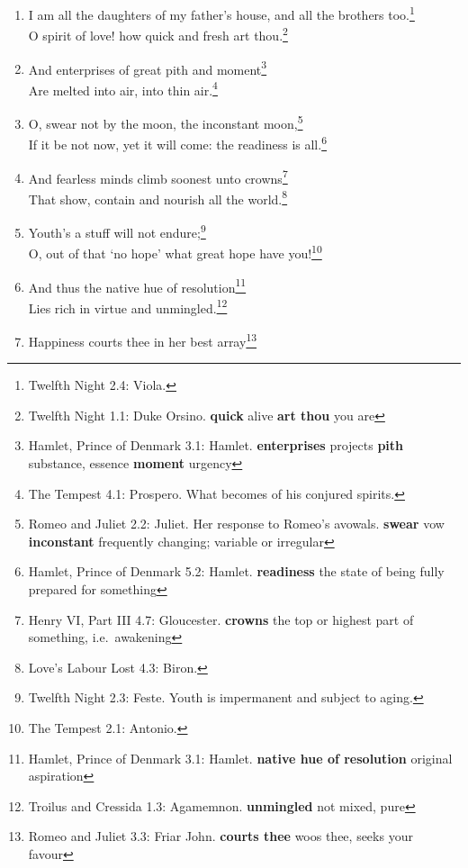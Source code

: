 \documentclass[17pt,twoside]{extarticle}
\begin{document}
\begin{enumerate}
  the very minute bids thee ope thine ear.\footnote{The Tempest 1.2:
    Prospero. He reveals to Miranda her past. \textbf{bids} asks
    \textbf{thee} you \textbf{ope} open \textbf{thine ear} your ear}
\item
  I am all the daughters of my father's house, and all the brothers
  too.\footnote{Twelfth Night 2.4: Viola.}\\O spirit of love! how quick
  and fresh art thou.\footnote{Twelfth Night 1.1: Duke Orsino.
    \textbf{quick} alive \textbf{art thou} you are}
\item
  And enterprises of great pith and moment\footnote{Hamlet, Prince of
    Denmark 3.1: Hamlet. \textbf{enterprises} projects \textbf{pith}
    substance, essence \textbf{moment} urgency}\\Are melted into air,
  into thin air.\footnote{The Tempest 4.1: Prospero. What becomes of his
    conjured spirits.}
\item
  O, swear not by the moon, the inconstant moon,\footnote{Romeo and
    Juliet 2.2: Juliet. Her response to Romeo's avowals. \textbf{swear}
    vow \textbf{inconstant} frequently changing; variable or irregular}\\If
  it be not now, yet it will come: the readiness is all.\footnote{Hamlet,
    Prince of Denmark 5.2: Hamlet. \textbf{readiness} the state of being
    fully prepared for something}
\item
  And fearless minds climb soonest unto crowns\footnote{Henry VI, Part
    III 4.7: Gloucester. \textbf{crowns} the top or highest part of
    something, i.e.~awakening}\\That show, contain and nourish all the
  world.\footnote{Love's Labour Lost 4.3: Biron.}
\item
  Youth's a stuff will not endure;\footnote{Twelfth Night 2.3: Feste.
    Youth is impermanent and subject to aging.}\\O, out of that `no
  hope' what great hope have you!\footnote{The Tempest 2.1: Antonio.}
\item
  And thus the native hue of resolution\footnote{Hamlet, Prince of
    Denmark 3.1: Hamlet. \textbf{native hue of resolution} original
    aspiration}\\Lies rich in virtue and unmingled.\footnote{Troilus and
    Cressida 1.3: Agamemnon. \textbf{unmingled} not mixed, pure}
\item
  Happiness courts thee in her best array\footnote{Romeo and Juliet 3.3:
    Friar John. \textbf{courts thee} woos thee, seeks your favour
}
\end{enumerate}
\end{document}

